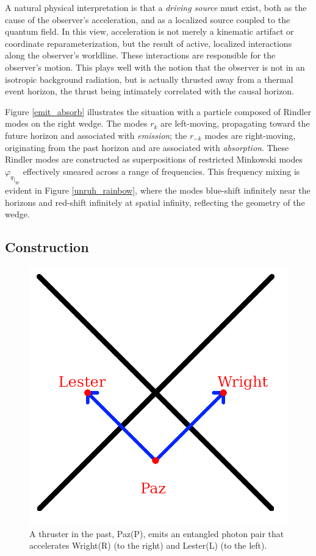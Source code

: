 \documentclass[12pt,a4paper]{article}
\begin{document}
A natural physical interpretation is that a {\it driving source} must exist, both as the cause of the observer’s acceleration, and as a localized source coupled to the quantum field. In this view, acceleration is not merely a kinematic artifact or coordinate reparameterization, but the result of active, localized interactions along the observer’s worldline. These interactions are responsible for the observer’s motion.  This plays well with the notion that the observer is not in an isotropic background radiation, but is actually thrusted away from a thermal event horizon, the thrust being intimately correlated with the causal horizon.


Figure \ref{emit_absorb} illustrates the situation with a particle composed of Rindler modes on the right wedge. The modes $r_k$ are left-moving, propagating toward the future horizon and associated with {\it emission}; the $r_{-k}$ modes are right-moving, originating from the past horizon and are associated with {\it absorption}. These Rindler modes are constructed as superpositions of restricted Minkowski modes ${\varphi_q}_{|_W}$ effectively smeared across a range of frequencies.  This frequency mixing is evident in Figure \ref{unruh_rainbow}, where the modes blue-shift infinitely near the horizons and red-shift infinitely at spatial infinity, reflecting the geometry of the wedge.

\subsection{Construction}

\begin{figure}[h]
\centering
\includegraphics[scale=0.75]{paz.png}
\captionsetup{width=0.7\textwidth}
\caption{A thruster in the past, Paz(P), emits an entangled photon pair that accelerates Wright(R) (to the right) and Lester(L) (to the left).}
\label{paz}
\end{figure}
\end{document}
